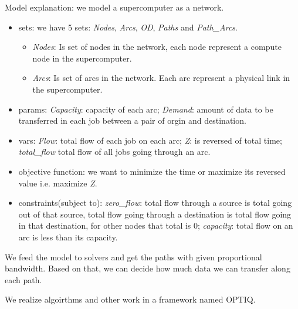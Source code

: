 \endgroup

Model explanation: we model a supercomputer as a network.

\begin{itemize}
    \item sets: we have 5 sets: \textit{Nodes}, \textit{Arcs}, \textit{OD}, \textit{Paths} and \textit{Path\_Arcs}. 
	\begin{itemize}
	    \item \textit{Nodes}: Is set of nodes in the network, each node represent a compute node in the supercomputer.
	    \item \textit{Arcs}: Is set of arcs in the network. Each arc represent a physical link in the supercomputer.
	\end{itemize}
    \item params: {\it Capacity}: capacity of each arc; {\it Demand}: amount of data to be transferred in each job between a pair of orgin and destination.
    \item vars: \textit{Flow}: total flow of each job on each arc; \textit{Z}: is reversed of total time; \textit{total\_flow} total flow of all jobs going through an arc.
    \item objective function: we want to minimize the time or maximize its reversed value i.e. maximize \textit{Z}.
    \item constraints(subject to): \textit{zero\_flow}: total flow through a source is total going out of that source, total flow going through a destination is total flow going in that destination, for other nodes that total is 0; \textit{capacity}: total flow on an arc is less than its capacity.
\end{itemize}

We feed the model to solvers and get the paths with given proportional bandwidth. Based on that, we can decide how much data we can transfer along each path.

We realize algoirthms and other work in a framework named OPTIQ.
